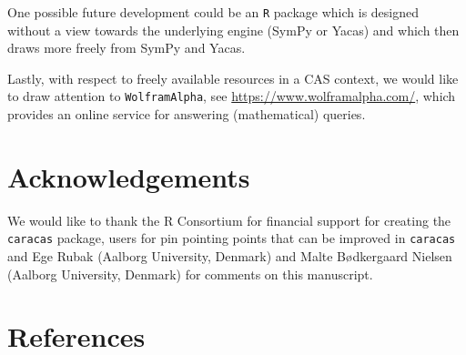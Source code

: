 One possible future development could be an \texttt{R} package which is
designed without a view towards the underlying engine (SymPy or Yacas)
and which then draws more freely from SymPy and Yacas.

Lastly, with respect to freely available resources in a CAS context, we would
like to draw attention to \texttt{WolframAlpha}, see
\url{https://www.wolframalpha.com/}, which provides an online service for
answering (mathematical) queries.

\hypertarget{acknowledgements}{%
\section{Acknowledgements}\label{acknowledgements}}

We would like to thank the R Consortium for financial support for
creating the \texttt{caracas} package, users for pin pointing points
that can be improved in \texttt{caracas} and Ege Rubak (Aalborg
University, Denmark) and Malte Bødkergaard Nielsen (Aalborg
University, Denmark) for comments on this manuscript.

\hypertarget{references}{%
\section*{References}\label{references}}

